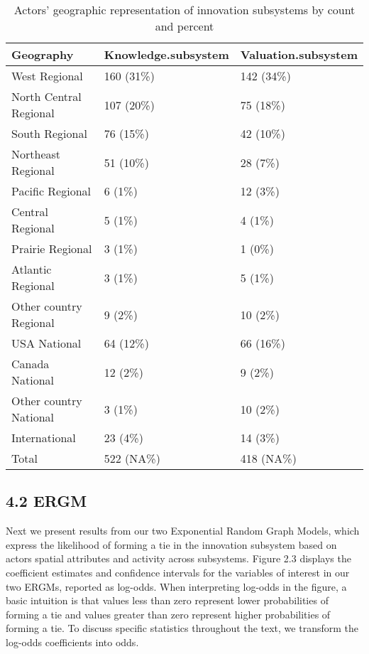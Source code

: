 \documentclass[twoside,12pt,final]{ucthesis-CA2012}
\begin{document}
\begin{ucmainmatter}
\begin{table}
\caption{\label{tab:unnamed-chunk-17}Actors' geographic representation of innovation subsystems by count and percent}
\centering
\begin{tabular}[t]{lll}
\toprule
Geography & Knowledge.subsystem & Valuation.subsystem\\
\midrule
West Regional & 160 (31\%) & 142 (34\%)\\
North Central Regional & 107 (20\%) & 75 (18\%)\\
South Regional & 76 (15\%) & 42 (10\%)\\
Northeast Regional & 51 (10\%) & 28 (7\%)\\
Pacific Regional & 6 (1\%) & 12 (3\%)\\
\addlinespace
Central Regional & 5 (1\%) & 4 (1\%)\\
Prairie Regional & 3 (1\%) & 1 (0\%)\\
Atlantic Regional & 3 (1\%) & 5 (1\%)\\
Other country Regional & 9 (2\%) & 10 (2\%)\\
USA National & 64 (12\%) & 66 (16\%)\\
\addlinespace
Canada National & 12 (2\%) & 9 (2\%)\\
Other country National & 3 (1\%) & 10 (2\%)\\
International & 23 (4\%) & 14 (3\%)\\
Total & 522 (NA\%) & 418 (NA\%)\\
\bottomrule
\end{tabular}
\end{table}
\hypertarget{ergm}{%
\subsection{4.2 ERGM}\label{ergm}}

Next we present results from our two Exponential Random Graph Models,
which express the likelihood of forming a tie in the innovation
subsystem based on actors\textquotesingle{} spatial attributes and activity across
subsystems. Figure 2.3 displays the coefficient estimates and confidence
intervals for the variables of interest in our two ERGMs, reported as
log-odds. When interpreting log-odds in the figure, a basic intuition is
that values less than zero represent lower probabilities of forming a
tie and values greater than zero represent higher probabilities of
forming a tie. To discuss specific statistics throughout the text, we
transform the log-odds coefficients into odds.

\hypertarget{organic-seed-as-a-spatially-sticky-regional-innovation-system}{%
}
\end{ucmainmatter}
\end{document}
